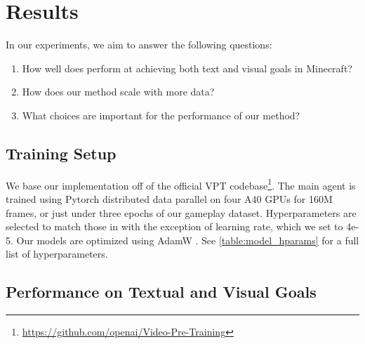 \section{Results}

In our experiments, we aim to answer the following questions:
\begin{enumerate}
    \vspace{-0.5em}
    \item How well does \agentname{} perform at achieving both text and visual goals in Minecraft?
    \vspace{-0.25em}
    \item How does our method scale with more data?
    \vspace{-0.25em}
    \item What choices are important for the performance of our method?
\end{enumerate}

\subsection{Training Setup}

We base our implementation off of the official VPT codebase\footnote{ \href{https://github.com/openai/Video-Pre-Training}{https://github.com/openai/Video-Pre-Training}}. The main \agentname{} agent is trained using Pytorch \citep{pytorch} distributed data parallel on four A40 GPUs for 160M frames, or just under three epochs of our gameplay dataset. Hyperparameters are selected to match those in \citet{baker2022vpt} with the exception of learning rate, which we set to 4e-5. Our models are optimized using AdamW \citep{adamw}. See \autoref{table:model_hparams} for a full list of hyperparameters.

\subsection{Performance on Textual and Visual Goals}
\label{sec:exp_perf}

